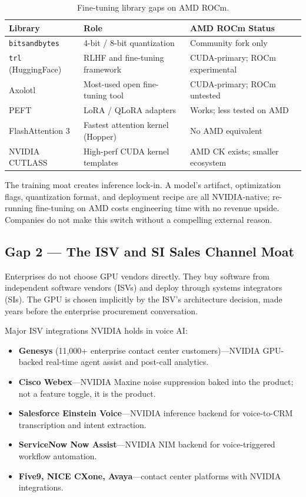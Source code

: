 \documentclass[blind]{gtac}
\begin{document}
\begin{table}[H]
\centering
\caption{Fine-tuning library gaps on AMD ROCm.}
\label{tab:finetune}
\tiny
\begin{tabular}{@{}lll@{}}
\toprule
Library & Role & AMD ROCm Status \\
\midrule
\texttt{bitsandbytes} & 4-bit / 8-bit quantization & Community fork only \\
\texttt{trl} (HuggingFace) & RLHF and fine-tuning framework & CUDA-primary; ROCm experimental \\
Axolotl & Most-used open fine-tuning tool & CUDA-primary; ROCm untested \\
PEFT & LoRA / QLoRA adapters & Works; less tested on AMD \\
FlashAttention 3 & Fastest attention kernel (Hopper) & No AMD equivalent \\
NVIDIA CUTLASS & High-perf CUDA kernel templates & AMD CK exists; smaller ecosystem \\
\bottomrule
\end{tabular}
\end{table}

The training moat creates inference lock-in. A model's artifact, optimization flags, quantization format, and deployment recipe are all NVIDIA-native; re-running fine-tuning on AMD costs engineering time with no revenue upside. Companies do not make this switch without a compelling external reason.

\subsection{Gap 2 --- The ISV and SI Sales Channel Moat}

Enterprises do not choose GPU vendors directly. They buy software from independent software vendors (ISVs) and deploy through systems integrators (SIs). The GPU is chosen implicitly by the ISV's architecture decision, made years before the enterprise procurement conversation.

Major ISV integrations NVIDIA holds in voice AI:
\begin{itemize}
  \item \textbf{Genesys} (11,000+ enterprise contact center customers)---NVIDIA GPU-backed real-time agent assist and post-call analytics.
  \item \textbf{Cisco Webex}---NVIDIA Maxine noise suppression baked into the product; not a feature toggle, it is the product.
  \item \textbf{Salesforce Einstein Voice}---NVIDIA inference backend for voice-to-CRM transcription and intent extraction.
  \item \textbf{ServiceNow Now Assist}---NVIDIA NIM backend for voice-triggered workflow automation.
  \item \textbf{Five9, NICE CXone, Avaya}---contact center platforms with NVIDIA integrations.
\end{itemize}
\end{document}
